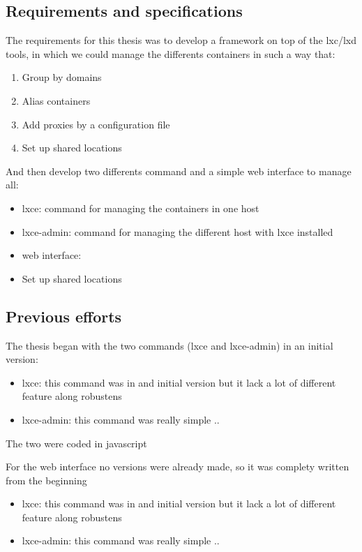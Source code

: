 \bigskip

\subsection{Requirements and specifications}
\label{ssec:requirements}
The requirements for this thesis was to develop a framework on top of the lxc/lxd tools, in which we could manage the differents containers in such a way that:
\begin{enumerate}
	\item {Group by domains}
	\item {Alias containers}
	\item {Add proxies by a configuration file}
	\item {Set up shared locations }
\end{enumerate}

And then develop two differents command and a simple web interface to manage all:
\begin{itemize}
	\item {lxce: command for managing the containers in one host}
	\item {lxce-admin: command for managing the different host with lxce installed}
	\item {web interface:}
	\item {Set up shared locations }
\end{itemize}

\subsection{Previous efforts}
\label{ssec:previous}
The thesis began with the two commands (lxce and lxce-admin) in an initial version:
\begin{itemize}
	\item {lxce: this command was in and initial version but it lack a lot of different feature along robustens}
	\item {lxce-admin: this command was really simple ..}
\end{itemize}
The two were coded in javascript 

For the web interface no versions were already made, so it was complety written from the beginning
\begin{itemize}
	\item {lxce: this command was in and initial version but it lack a lot of different feature along robustens}
	\item {lxce-admin: this command was really simple ..}
\end{itemize}

